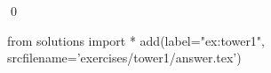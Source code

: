 
\begin{ex} 
  \label{ex:tower1}
  
  \qed
\end{ex} 
\begin{python0}
from solutions import *
add(label="ex:tower1",
    srcfilename='exercises/tower1/answer.tex') 
\end{python0}
